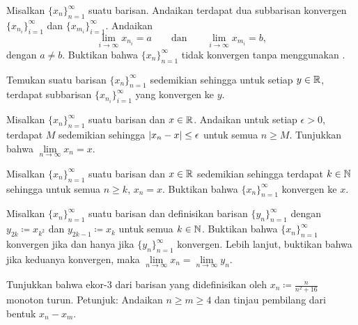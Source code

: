 \begin{exercise}
\pagebreak[2]
Misalkan $\{ x_n \}_{n=1}^\infty$ suatu barisan.
Andaikan terdapat dua subbarisan konvergen $\{ x_{n_i} \}_{i=1}^\infty$ dan
$\{ x_{m_i} \}_{i=1}^\infty$.  Andaikan
\begin{equation*}
\lim_{i\to\infty} x_{n_i} = a
\qquad \text{dan} \qquad
\lim_{i\to\infty} x_{m_i} = b,
\end{equation*}
dengan $a \neq b$.  Buktikan bahwa $\{ x_n \}_{n=1}^\infty$ tidak konvergen tanpa
menggunakan .
\end{exercise}

\begin{exercise}
Temukan suatu barisan $\{ x_n \}_{n=1}^\infty$ sedemikian sehingga untuk setiap $y \in {\mathbb{R}}$, terdapat
subbarisan $\{ x_{n_i} \}_{i=1}^\infty$ yang konvergen ke $y$.
\end{exercise}

\begin{exercise}[Mudah]
Misalkan $\{ x_n \}_{n=1}^\infty$ suatu barisan dan $x \in {\mathbb{R}}$.
Andaikan untuk setiap $\epsilon > 0$, terdapat $M$ sedemikian sehingga
$\lvert {x_n-x} \rvert \leq \epsilon$ untuk semua $n \geq M$.
Tunjukkan bahwa $\lim\limits_{n\to\infty} x_n = x$.
\end{exercise}

\begin{exercise}[Mudah]
Misalkan $\{ x_n \}_{n=1}^\infty$ suatu barisan dan $x \in {\mathbb{R}}$ sedemikian sehingga
terdapat $k \in {\mathbb{N}}$ sehingga untuk semua $n \geq k$,
$x_n = x$.  Buktikan bahwa $\{ x_n \}_{n=1}^\infty$ konvergen ke $x$.
\end{exercise}

\begin{exercise}
Misalkan $\{ x_n \}_{n=1}^\infty$ suatu barisan dan
definisikan barisan $\{ y_n \}_{n=1}^\infty$ dengan
$y_{2k} \coloneqq x_{k^2}$ dan $y_{2k-1} \coloneqq x_k$ untuk semua $k \in {\mathbb{N}}$.
Buktikan bahwa $\{ x_n \}_{n=1}^\infty$ konvergen jika dan hanya jika
$\{ y_n \}_{n=1}^\infty$ konvergen.
Lebih lanjut, buktikan bahwa jika keduanya konvergen, maka
$\lim\limits_{n\to\infty} x_n = \lim\limits_{n\to\infty} y_n$.
\end{exercise}

\begin{exercise}
Tunjukkan bahwa ekor-3 dari barisan yang didefinisikan oleh $x_n \coloneqq \frac{n}{n^2+16}$
monoton turun.  Petunjuk: Andaikan $n \geq m \geq 4$ dan tinjau
pembilang dari bentuk $x_n-x_m$.
\end{exercise}

